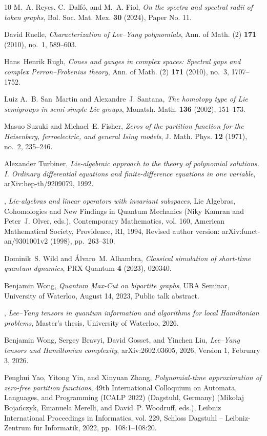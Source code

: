 \documentclass[reqno]{amsart}
\theoremstyle{definition}
\theoremstyle{remark}
\begin{document}
\begin{thebibliography}{10}
M.~A. Reyes, C.~Dalf{\'o}, and M.~A. Fiol, \emph{On the spectra and spectral
  radii of token graphs}, Bol. Soc. Mat. Mex. \textbf{30} (2024), Paper No. 11.

David Ruelle, \emph{Characterization of {Lee--Yang} polynomials}, Ann. of Math.
  (2) \textbf{171} (2010), no.~1, 589--603.

Hans~Henrik Rugh, \emph{Cones and gauges in complex spaces: Spectral gaps and
  complex {Perron--Frobenius} theory}, Ann. of Math. (2) \textbf{171} (2010),
  no.~3, 1707--1752.

Luiz A.~B. San~Martin and Alexandre~J. Santana, \emph{The homotopy type of
  {Lie} semigroups in semi-simple {Lie} groups}, Monatsh. Math. \textbf{136}
  (2002), 151--173.

Masuo Suzuki and Michael~E. Fisher, \emph{Zeros of the partition function for
  the {Heisenberg}, ferroelectric, and general {Ising} models}, J. Math. Phys.
  \textbf{12} (1971), no.~2, 235--246.

Alexander Turbiner, \emph{{Lie}-algebraic approach to the theory of polynomial
  solutions. {I}. {Ordinary} differential equations and finite-difference
  equations in one variable}, arXiv:hep-th/9209079, 1992.

\bysame, \emph{{Lie}-algebras and linear operators with invariant subspaces},
  Lie Algebras, Cohomologies and New Findings in Quantum Mechanics (Niky Kamran
  and Peter~J. Olver, eds.), Contemporary Mathematics, vol. 160, American
  Mathematical Society, Providence, RI, 1994, Revised author version:
  arXiv:funct-an/9301001v2 (1998), pp.~263--310.

Dominik~S. Wild and {\'A}lvaro~M. Alhambra, \emph{Classical simulation of
  short-time quantum dynamics}, PRX Quantum \textbf{4} (2023), 020340.

Benjamin Wong, \emph{Quantum {Max-Cut} on bipartite graphs}, URA Seminar,
  University of Waterloo, August 14, 2023, Public talk abstract.

\bysame, \emph{{Lee--Yang} tensors in quantum information and algorithms for
  local {Hamiltonian} problems}, Master's thesis, University of Waterloo, 2026.

Benjamin Wong, Sergey Bravyi, David Gosset, and Yinchen Liu, \emph{{Lee--Yang}
  tensors and {Hamiltonian} complexity}, arXiv:2602.03605, 2026, Version 1,
  February 3, 2026.

Penghui Yao, Yitong Yin, and Xinyuan Zhang, \emph{Polynomial-time approximation
  of zero-free partition functions}, 49th International Colloquium on Automata,
  Languages, and Programming ({ICALP} 2022) (Dagstuhl, Germany) (Miko{\l}aj
  Boja\'{n}czyk, Emanuela Merelli, and David~P. Woodruff, eds.), Leibniz
  International Proceedings in Informatics, vol. 229, Schloss Dagstuhl --
  Leibniz-Zentrum f{\"u}r Informatik, 2022, pp.~108:1--108:20.

\end{thebibliography}

\enlargethispage{3\baselineskip}
\end{document}
